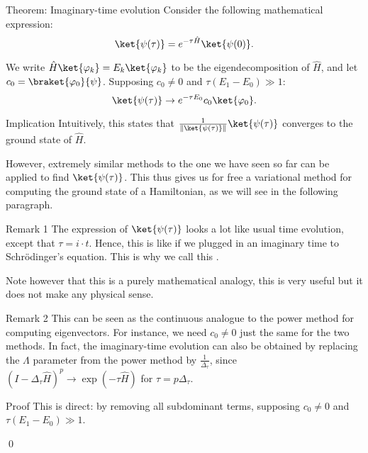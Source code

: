 \documentclass[a4paper]{article}
\begin{document}
\begin{parag}{Theorem: Imaginary-time evolution}
    Consider the following mathematical expression:
    \[\ket{\psi\left(\tau\right)} = e^{-\tau \hat{H}} \ket{\psi\left(0\right)}.\]

    We write $\hat{H} \ket{\phi_k} = E_k \ket{\phi_k}$ to be the eigendecomposition of $\hat{H}$, and let $c_0 = \braket{\phi_0}{\psi}$. Supposing $c_0 \neq 0$ and $\tau\left(E_1 - E_0\right) \gg 1$: 
    \[\ket{\psi\left(\tau\right)} \to e^{-\tau E_0} c_0 \ket{\phi_0}.\]

    \begin{subparag}{Implication}
        Intuitively, this states that $\frac{1}{\left\|\ket{\psi\left(\tau\right)}\right\|} \ket{\psi\left(\tau\right)}$ converges to the ground state of $\hat{H}$.

        However, extremely similar methods to the one we have seen so far can be applied to find $\ket{\psi\left(\tau\right)}$. This thus gives us for free a variational method for computing the ground state of a Hamiltonian, as we will see in the following paragraph.
    \end{subparag}

    \begin{subparag}{Remark 1}
        The expression of $\ket{\psi\left(\tau\right)}$ looks a lot like usual time evolution, except that $\tau = i\cdot t$. Hence, this is like if we plugged in an imaginary time to Schrödinger's equation. This is why we call this .

        Note however that this is a purely mathematical analogy, this is very useful but it does not make any physical sense.
    \end{subparag}

    \begin{subparag}{Remark 2}
        This can be seen as the continuous analogue to the power method for computing eigenvectors. For instance, we need $c_0 \neq 0$ just the same for the two methods. In fact, the imaginary-time evolution can also be obtained by replacing the $\Lambda$ parameter from the power method by $\frac{1}{\Delta_{\tau}}$, since $\left(I - \Delta_{\tau} \hat{H}\right)^p \to \exp\left(-\tau \hat{H}\right)$ for $\tau = p \Delta_{\tau}$.
    \end{subparag}

    \begin{subparag}{Proof}
        This is direct:
        by removing all subdominant terms, supposing $c_0 \neq 0$ and $\tau\left(E_1 - E_0\right) \gg 1$.

        \qed
    \end{subparag}
\end{parag}
\end{document}
